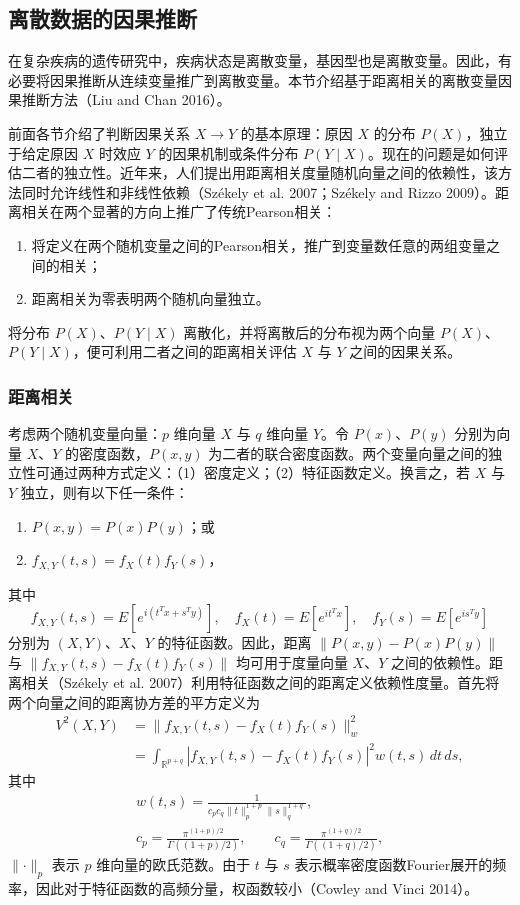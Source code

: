 \subsection{离散数据的因果推断}
在复杂疾病的遗传研究中，疾病状态是离散变量，基因型也是离散变量。因此，有必要将因果推断从连续变量推广到离散变量。本节介绍基于距离相关的离散变量因果推断方法（Liu and Chan 2016）。

前面各节介绍了判断因果关系 $X\to Y$ 的基本原理：原因 $X$ 的分布 $P(X)$，独立于给定原因 $X$ 时效应 $Y$ 的因果机制或条件分布 $P(Y\mid X)$。现在的问题是如何评估二者的独立性。近年来，人们提出用距离相关度量随机向量之间的依赖性，该方法同时允许线性和非线性依赖（Székely et al. 2007；Székely and Rizzo 2009）。距离相关在两个显著的方向上推广了传统Pearson相关：
\begin{enumerate}
\item 将定义在两个随机变量之间的Pearson相关，推广到变量数任意的两组变量之间的相关；
\item 距离相关为零表明两个随机向量独立。
\end{enumerate}
将分布 $P(X)$、$P(Y\mid X)$ 离散化，并将离散后的分布视为两个向量 $P(X)$、$P(Y\mid X)$，便可利用二者之间的距离相关评估 $X$ 与 $Y$ 之间的因果关系。

\subsubsection{距离相关}
考虑两个随机变量向量：$p$ 维向量 $X$ 与 $q$ 维向量 $Y$。令 $P(x)$、$P(y)$ 分别为向量 $X$、$Y$ 的密度函数，$P(x,y)$ 为二者的联合密度函数。两个变量向量之间的独立性可通过两种方式定义：（1）密度定义；（2）特征函数定义。换言之，若 $X$ 与 $Y$ 独立，则有以下任一条件：
\begin{enumerate}
\item $P(x,y)=P(x)P(y)$；或
\item $f_{X,Y}(t,s)=f_X(t)f_Y(s)$，
\end{enumerate}
其中
\[
f_{X,Y}(t,s)=E[e^{i(t^Tx+s^Ty)}],\quad
f_X(t)=E[e^{it^Tx}],\quad f_Y(s)=E[e^{is^Ty}]
\]
分别为 $(X,Y)$、$X$、$Y$ 的特征函数。因此，距离 $\lVert P(x,y)-P(x)P(y)\rVert$ 与 $\lVert f_{X,Y}(t,s)-f_X(t)f_Y(s)\rVert$ 均可用于度量向量 $X$、$Y$ 之间的依赖性。距离相关（Székely et al. 2007）利用特征函数之间的距离定义依赖性度量。首先将两个向量之间的距离协方差的平方定义为
\begin{equation}
\begin{aligned}
V^2(X,Y)&=\lVert f_{X,Y}(t,s)-f_X(t)f_Y(s)\rVert_w^2\\
&=\int_{\mathbb R^{p+q}}|f_{X,Y}(t,s)-f_X(t)f_Y(s)|^2w(t,s)\,dt\,ds,
\end{aligned}
\tag{7.168}
\end{equation}
其中
\[
\begin{gathered}
w(t,s)=\frac1{c_pc_q\lVert t\rVert_p^{1+p}\lVert s\rVert_q^{1+q}},\\
c_p=\frac{\pi^{(1+p)/2}}{\Gamma((1+p)/2)},\qquad
c_q=\frac{\pi^{(1+q)/2}}{\Gamma((1+q)/2)},
\end{gathered}
\]
$\lVert\cdot\rVert_p$ 表示 $p$ 维向量的欧氏范数。由于 $t$ 与 $s$ 表示概率密度函数Fourier展开的频率，因此对于特征函数的高频分量，权函数较小（Cowley and Vinci 2014）。

